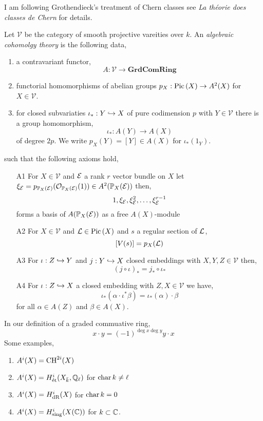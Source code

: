 \documentclass[12pt]{article}
\begin{document}
\newcommand{\cV}{\mathcal{V}}

\begin{rmk}
I am following Grothendieck's treatment of Chern classes see \textit{La th\'{e}orie does classes de Chern} for details.
\end{rmk}

\begin{defn}
Let $\cV$ be the category of smooth projective vareities over $k$. An \textit{algebraic cohomolgy theory} is the following data,
\begin{enumerate}
\item a contravariant functor,
\[ A : \cV \to \mathbf{GrdComRing} \]

\item functorial homomorphisms of abelian groups $p_X : \mathrm{Pic} \left( X \right) \to A^2(X)$ for $X \in \cV$. 

\item for closed subvariaties $\iota_* : Y \hookrightarrow X$ of pure codimension $p$ with $Y \in \cV$ there is a group homomorphism,
\[ \iota_* : A(Y) \to A(X) \]
of degree $2p$. We write $p_X(Y) = [Y] \in A(X)$ for $\iota_*(1_Y)$.
\end{enumerate}
such that the following axioms hold,
\begin{enumerate}
\item[A1] For $X \in \cV$ and $\mathcal{E}$ a rank $r$ vector bundle on $X$ let $\xi_{\mathcal{E}} = p_{\mathbb{P}_X(\mathcal{E})}(\mathcal{O}_{\mathbb{P}_X(\mathcal{E})}(1)) \in A^2(\mathbb{P}_X(\mathcal{E}))$ then, 
\[ 1, \xi_{\mathcal{E}}, \xi_{\mathcal{E}}^2, \dots, \xi_{\mathcal{E}}^{r-1} \]
forms a basis of $A(\mathbb{P}_X(\mathcal{E}))$ as a free $A(X)$-module

\item[A2] For $X \in \cV$ and $\mathcal{L} \in \mathrm{Pic} \left( X \right)$ and $s$ a regular section of $\mathcal{L}$,
\[ [V(s)] = p_X(\mathcal{L}) \]

\item[A3] For $\iota : Z \hookrightarrow Y$ and $j : Y \hookrightarrow X$ closed embeddings with $X,Y,Z \in \cV$ then,
\[ (j \circ \iota)_* = j_* \circ \iota_* \]

\item[A4] For $\iota : Z \hookrightarrow X$ a closed embedding with $Z, X \in \cV$ we have,
\[ \iota_* (\alpha \cdot \iota^* \beta) = \iota_*(\alpha) \cdot \beta \]
for all $\alpha \in A(Z)$ and $\beta \in A(X)$.
\end{enumerate}
\end{defn}

\begin{rmk}
In our definition of a graded commuative ring,
\[ x \cdot y = (-1)^{\deg{x} \deg{y}} y \cdot x \]
Some examples,
\begin{enumerate}
\item $A^i(X) = \mathrm{CH}^{2i}(X)$
\item $A^i(X) = H_{\text{\'{e}t}}^i(X_{\bar{k}}, \mathbb{Q}_\ell)$ for $\operatorname{\mathrm{char}}{k} \neq \ell$
\item $A^i(X) = H_{\mathrm{dR}}^i(X)$ for $\operatorname{\mathrm{char}}{k} = 0$
\item $A^i(X) = H_{\text{sing}}^i(X(\mathbb{C}))$ for $k \subset \mathbb{C}$.
\end{enumerate}
\end{rmk}
\end{document}
